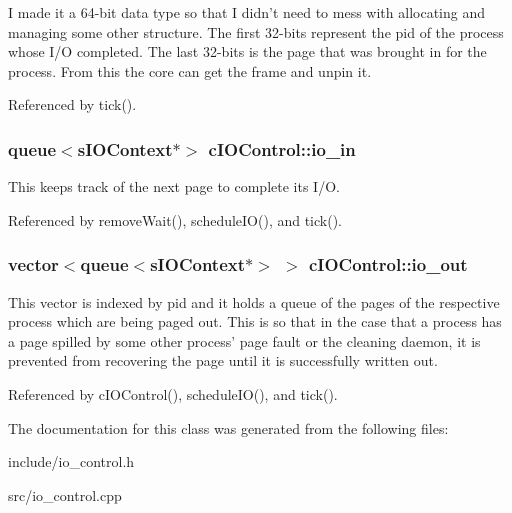 \-I made it a 64-\/bit data type so that \-I didn't need to mess with allocating and managing some other structure. \-The first 32-\/bits represent the pid of the process whose \-I/\-O completed. \-The last 32-\/bits is the page that was brought in for the process. \-From this the core can get the frame and unpin it. 

\-Referenced by tick().

\hypertarget{classcIOControl_a6918230a2e9f6e1e5fdade78da2d835b}{
\subsubsection[{io\-\_\-in}]{\setlength{\rightskip}{0pt plus 5cm}queue$<${\bf s\-I\-O\-Context}$\ast$$>$ {\bf c\-I\-O\-Control\-::io\-\_\-in}}}\label{da/d8f/classcIOControl_a6918230a2e9f6e1e5fdade78da2d835b}
\-This keeps track of the next page to complete its \-I/\-O. 

\-Referenced by remove\-Wait(), schedule\-I\-O(), and tick().

\hypertarget{classcIOControl_a51a2c3ce8bf36b9302d835afb204c821}{
\subsubsection[{io\-\_\-out}]{\setlength{\rightskip}{0pt plus 5cm}vector$<$queue$<${\bf s\-I\-O\-Context}$\ast$$>$ $>$ {\bf c\-I\-O\-Control\-::io\-\_\-out}}}\label{da/d8f/classcIOControl_a51a2c3ce8bf36b9302d835afb204c821}
\-This vector is indexed by pid and it holds a queue of the pages of the respective process which are being paged out. \-This is so that in the case that a process has a page spilled by some other process' page fault or the cleaning daemon, it is prevented from recovering the page until it is successfully written out. 

\-Referenced by c\-I\-O\-Control(), schedule\-I\-O(), and tick().



\-The documentation for this class was generated from the following files\-:\begin{DoxyCompactItemize}
\item 
include/io\-\_\-control.\-h\item 
src/io\-\_\-control.\-cpp\end{DoxyCompactItemize}

